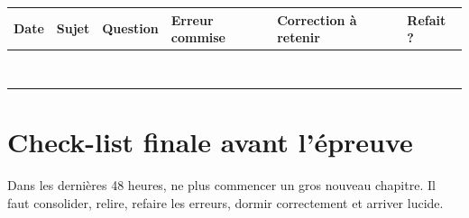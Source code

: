 \documentclass[11pt,a4paper]{article}
\begin{document}
\footnotesize
\begin{longtable}{|p{1.8cm}|p{2.5cm}|p{2cm}|p{4cm}|p{4cm}|p{2cm}|}
\hline
\textbf{Date} & \textbf{Sujet} & \textbf{Question} & \textbf{Erreur commise} & \textbf{Correction à retenir} & \textbf{Refait ?}\\
\hline
 & & & & & \\
\hline
 & & & & & \\
\hline
 & & & & & \\
\hline
 & & & & & \\
\hline
 & & & & & \\
\hline
 & & & & & \\
\hline
 & & & & & \\
\hline
 & & & & & \\
\hline
\end{longtable}
\normalsize

\section{Check-list finale avant l'épreuve}

\begin{alerte}
Dans les dernières 48 heures, ne plus commencer un gros nouveau chapitre.  
Il faut consolider, relire, refaire les erreurs, dormir correctement et arriver lucide.
\end{alerte}
\end{document}

